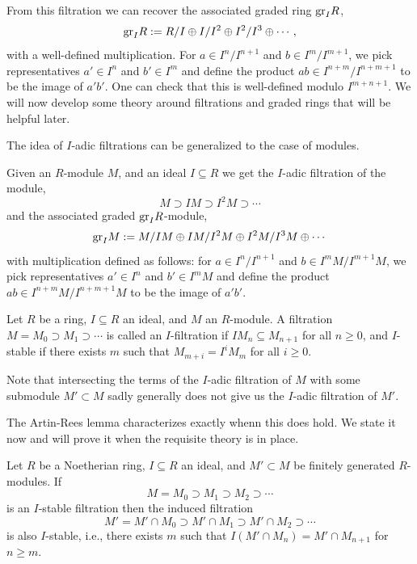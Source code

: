 \documentclass[12pt]{amsproc}
\begin{document}
    From this filtration we can recover the associated graded ring $\text{gr}_I R$, 
    \[\text{gr}_I R := R/I \oplus I/I^2 \oplus I^2/I^3 \oplus \cdots,\]
    with a well-defined multiplication. For $a \in I^n/I^{n+1}$ and $b \in I^m/I^{m+1}$, we pick representatives $a' \in I^n$ and $b' \in I^m$ and define the product $ab \in I^{n+m}/I^{n+m+1}$ to be the image of $a'b'$. One can check that this is well-defined modulo $I^{m+n+1}$. We will now develop some theory around filtrations and graded rings that will be helpful later. 

    The idea of $I$-adic filtrations can be generalized to the case of modules. 
    \begin{definition}
        Given an $R$-module $M$, and an ideal $I \subseteq R$ we get the $I$-adic filtration of the module,
        \[M \supset IM \supset I^2M \supset \cdots\] 
        and the associated graded $\text{gr}_I R$-module,
        \[\text{gr}_I M := M/IM \oplus IM/I^2M \oplus I^2M/I^3M \oplus \cdots\]
        with multiplication defined as follows: for $a \in I^n/I^{n+1}$ and $b \in I^mM/I^{m+1}M$, we pick representatives $a' \in I^n$ and $b' \in I^mM$ and define the product $ab \in I^{n+m}M/I^{n+m+1}M$ to be the image of $a'b'$.
    \end{definition}

    \begin{definition}
        Let $R$ be a ring, $I \subseteq R$ an ideal, and $M$ an $R$-module. A filtration $M = M_0 \supset M_1 \supset \cdots$ is called an $I$-filtration if $IM_n \subseteq M_{n+1}$ for all $n \geq 0$, and $I$-stable if there exists $m$ such that $M_{m+i} = I^i M_m$ for all $i \geq 0$.
    \end{definition}

    \begin{remark}
        Note that intersecting the terms of the $I$-adic filtration of $M$ with some submodule $M' \subset M$ sadly generally does not give us the $I$-adic filtration of $M'$. 
    \end{remark}

    The Artin-Rees lemma characterizes exactly whenn this does hold. We state it now and will prove it when the requisite theory is in place. 
    
    \begin{lemma}
        Let $R$ be a Noetherian ring, $I \subseteq R$ an ideal, and $M' \subset M$ be finitely generated $R$-modules. If
        \[M = M_0 \supset M_1 \supset M_2 \supset \cdots\]
        is an $I$-stable filtration then the induced filtration
        \[M' = M' \cap M_0 \supset M' \cap  M_1 \supset M' \cap  M_2 \supset \cdots\]
        is also $I$-stable, i.e., there exists $m$ such that $I(M' \cap M_n) = M' \cap M_{n+1}$ for $n \geq m$. 
    \end{lemma}
\end{document}
